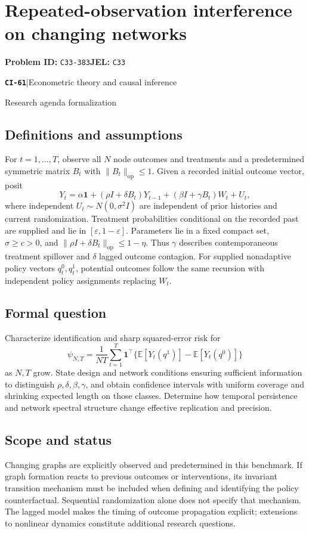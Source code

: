 \documentclass[11pt,a4paper]{article}
\newcommand{\E}{\mathbb E}
\newcommand{\entrymeta}[3]{{\sffamily\small\color{muted}\textbf{\texttt{#1}}\quad|\quad #2\par #3\par}}
\begin{document}
\section*{Repeated-observation interference on changing networks}
\textbf{Problem ID:} \texttt{C33-383}\quad \textbf{JEL:} \texttt{C33}\par
\label{problem:OP-0540}
\label{beyond:CI-61}
\entrymeta{CI-61}{Econometric theory and causal inference}{Research agenda formalization}
\subsection*{Definitions and assumptions}
For $t=1,\ldots,T$, observe all $N$ node outcomes and treatments and a predetermined symmetric matrix $B_t$ with $\|B_t\|_{\mathrm{op}}\leq1$. Given a recorded initial outcome vector, posit
\[
 Y_t=\alpha\mathbf1+(\rho I+\delta B_t)Y_{t-1}
             +(\beta I+\gamma B_t)W_t+U_t,
\]
where independent $U_t\sim N(0,\sigma^2 I)$ are independent of prior histories and current randomization. Treatment probabilities conditional on the recorded past are supplied and lie in $[\varepsilon,1-\varepsilon]$. Parameters lie in a fixed compact set, $\sigma\geq c>0$, and $\|\rho I+\delta B_t\|_{\mathrm{op}}\leq1-\eta$. Thus $\gamma$ describes contemporaneous treatment spillover and $\delta$ lagged outcome contagion. For supplied nonadaptive policy vectors $q_t^0,q_t^1$, potential outcomes follow the same recursion with independent policy assignments replacing $W_t$.
\subsection*{Formal question}
Characterize identification and sharp squared-error risk for
\[
 \psi_{N,T}=\frac1{NT}\sum_{t=1}^T
 \mathbf1^\top\{\E[Y_t(q^1)]-\E[Y_t(q^0)]\}
\]
as $N,T$ grow. State design and network conditions ensuring sufficient information to distinguish $\rho,\delta,\beta,\gamma$, and obtain confidence intervals with uniform coverage and shrinking expected length on those classes. Determine how temporal persistence and network spectral structure change effective replication and precision.
\subsection*{Scope and status}
Changing graphs are explicitly observed and predetermined in this benchmark. If graph formation reacts to previous outcomes or interventions, its invariant transition mechanism must be included when defining and identifying the policy counterfactual. Sequential randomization alone does not specify that mechanism. The lagged model makes the timing of outcome propagation explicit; extensions to nonlinear dynamics constitute additional research questions.
\end{document}

